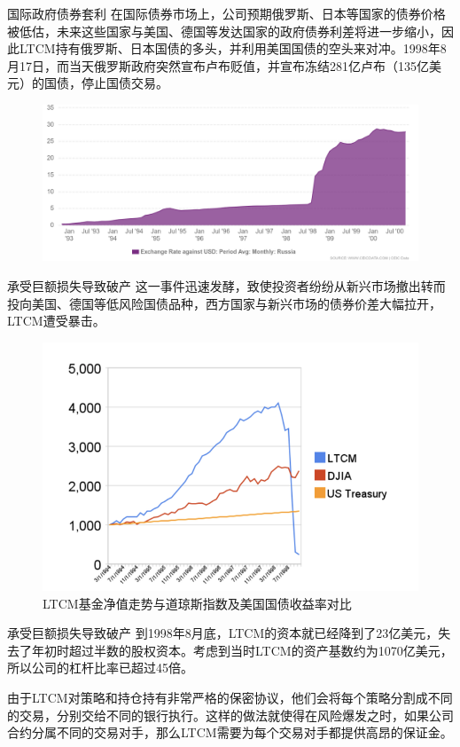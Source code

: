 \begin{frame}{国际政府债券套利}
    在国际债券市场上，公司预期俄罗斯、日本等国家的债券价格被低估，未来这些国家与美国、德国等发达国家的政府债券利差将进一步缩小，因此LTCM持有俄罗斯、日本国债的多头，并利用美国国债的空头来对冲。1998年8月17日，而当天俄罗斯政府突然宣布卢布贬值，并宣布冻结281亿卢布（135亿美元）的国债，停止国债交易。
    \begin{figure}
        \centering
        \includegraphics[width=\linewidth]{img/rub_usd.png}
    \end{figure}
\end{frame}

\begin{frame}{承受巨额损失导致破产}
    这一事件迅速发酵，致使投资者纷纷从新兴市场撤出转而投向美国、德国等低风险国债品种，西方国家与新兴市场的债券价差大幅拉开，LTCM遭受暴击。
    \begin{figure}[H]
        \centering
        \includegraphics[width=0.8\linewidth]{img/图片 1.png}
        \caption{LTCM基金净值走势与道琼斯指数及美国国债收益率对比}
    \end{figure}
\end{frame}
\begin{frame}{承受巨额损失导致破产}
    到1998年8月底，LTCM的资本就已经降到了23亿美元，失去了年初时超过半数的股权资本。考虑到当时LTCM的资产基数约为1070亿美元，所以公司的杠杆比率已超过45倍。

    由于LTCM对策略和持仓持有非常严格的保密协议，他们会将每个策略分割成不同的交易，分别交给不同的银行执行。这样的做法就使得在风险爆发之时，如果公司合约分属不同的交易对手，那么LTCM需要为每个交易对手都提供高昂的保证金。
\end{frame}
